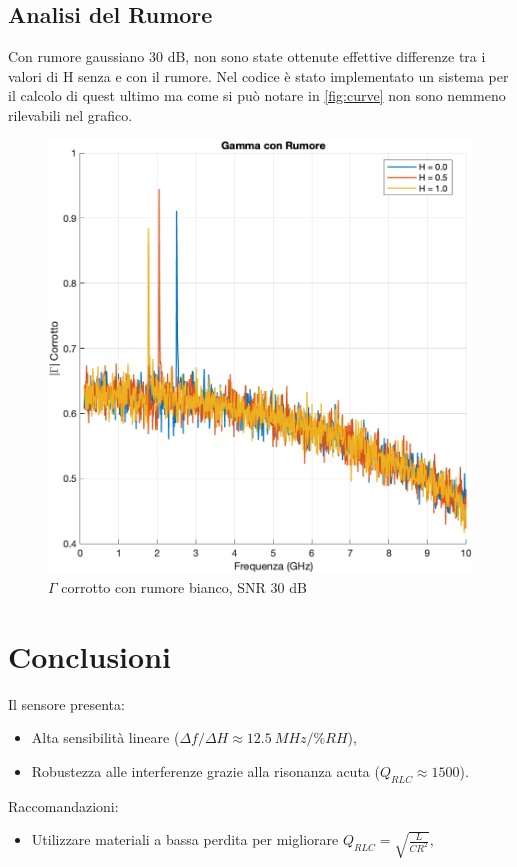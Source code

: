 \documentclass[conference]{IEEEtran}
\begin{document}
\subsection{Analisi del Rumore}
Con rumore gaussiano 30 dB, non sono state ottenute effettive differenze tra i valori di H senza e con il rumore. Nel codice è stato implementato un sistema per il calcolo di quest ultimo ma come si può notare in \autoref{fig:curve} non sono nemmeno rilevabili nel grafico.
\begin{figure}[!ht]
    \centering
    \includegraphics[width=\linewidth]{img/rumore.png}
    \caption{$\Gamma $ corrotto con rumore bianco, SNR 30 dB}
    \label{fig:rumore}
\end{figure}
\section{Conclusioni}
Il sensore presenta:
\begin{itemize}
    \item Alta sensibilità  lineare (\(\Delta f/\Delta H \approx \SI{12.5}{MHz/\%RH}\)),
    
    \item Robustezza alle interferenze grazie alla risonanza acuta (\(Q_{RLC} \approx 1500\)).
\end{itemize}
Raccomandazioni:
\begin{itemize}
    \item Utilizzare materiali a bassa perdita per migliorare \(Q_{RLC} = \sqrt{\frac{L}{CR^2}}\),
    
\end{itemize}
\end{document}
